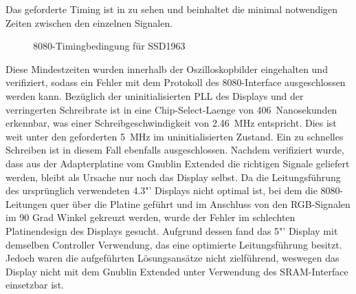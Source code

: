 \newpage
Das geforderte Timing ist in  zu sehen und beinhaltet die minimal notwendigen Zeiten zwischen den einzelnen Signalen.
\begin{figure}[htp]
	\centering
{}
	\caption{8080-Timingbedingung für SSD1963}
	\label{fig:ssd1963_timing_constraints}
\end{figure}
Diese Mindestzeiten wurden innerhalb der Oszilloskopbilder eingehalten und verifiziert, sodass ein Fehler mit dem Protokoll des 8080-Interface ausgeschlossen werden kann. Bezüglich der uninitialisierten PLL des Displays und der verringerten Schreibrate ist in  eine Chip-Select-Laenge von 406~Nanosekunden erkennbar, was einer Schreibgeschwindigkeit von 2.46~MHz entspricht. Dies ist weit unter den geforderten 5~MHz im uninitialisierten Zustand. Ein zu schnelles Schreiben ist in diesem Fall ebenfalls ausgeschlossen. Nachdem verifiziert wurde, dass aus der Adapterplatine vom Gnublin Extended die richtigen Signale geliefert werden, bleibt als Ursache nur noch das Display selbst. Da die Leitungsführung des ursprünglich verwendeten 4.3"' Displays nicht optimal ist, bei dem die 8080-Leitungen quer über die Platine geführt und im Anschluss von den RGB-Signalen im 90 Grad Winkel gekreuzt werden, wurde der Fehler im schlechten Platinendesign des Displays gesucht. Aufgrund dessen fand das 5"' Display mit demselben Controller Verwendung, das eine optimierte Leitungsführung besitzt. Jedoch waren die aufgeführten Lösungsansätze nicht zielführend, weswegen das Display nicht mit dem Gnublin Extended unter Verwendung des SRAM-Interface einsetzbar ist.